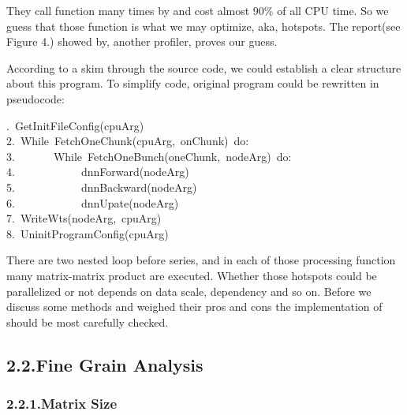 \documentclass{article}
\begin{document}
\noindent{}They call  function  many times by  and 
cost almost 90\% of all CPU time. So we guess that those function
 is what we may optimize, aka, hotspots.
The report(see Figure 4.) showed by, another profiler, proves our guess.%

According to a skim through the source code, we could establish a clear structure about this program. To simplify code, original program could be rewritten in pseudocode:%
\begin{mdpre}%
.~{GetInitFileConfig}(cpuArg)\\
{2}.~{While}~{FetchOneChunk}(cpuArg,~onChunk)~{do}:\\
{3}.~~~~~~~{While}~{FetchOneBunch}(oneChunk,~nodeArg)~{do}:\\
{4}.~~~~~~~~~~~~dnnForward(nodeArg)\\
{5}.~~~~~~~~~~~~dnnBackward(nodeArg)\\
{6}.~~~~~~~~~~~~dnnUpate(nodeArg)\\
{7}.~{WriteWts}(nodeArg,~cpuArg)\\
{8}.~{UninitProgramConfig}(cpuArg)\\
\end{mdpre}\noindent{}There are two nested loop before  series, and 
in each of those processing function many matrix-matrix product are
executed. Whether those hotspots could be parallelized or not depends
on data scale, dependency and so on. Before we discuss some methods and weighed their pros and cons the implementation of  should be most carefully checked.

\subsection{2.2.\hspace*{0.5em}Fine Grain Analysis}\label{sec-fine-grain-analysis}%

\subsubsection{2.2.1.\hspace*{0.5em}Matrix Size}\label{sec-matrix-size}%
\end{document}
